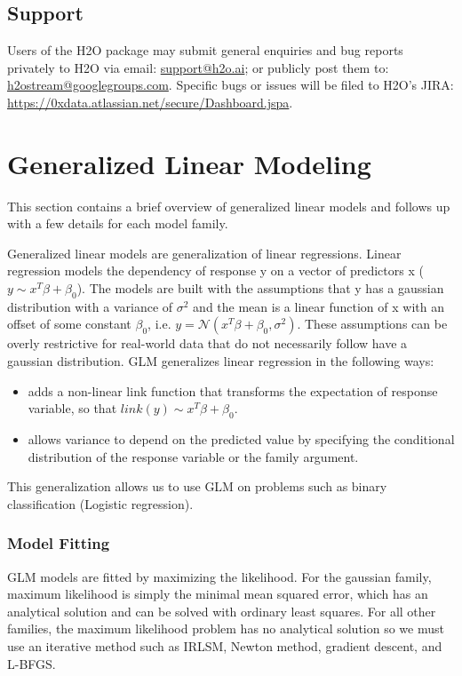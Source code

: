 \documentclass[11pt]{article}
\begin{document}
\subsection{Support} 

Users of the H2O package may submit general enquiries and bug reports privately to H2O via email: \url {support@h2o.ai}; or publicly post them to: \url {h2ostream@googlegroups.com}. Specific bugs or issues will be filed to H2O's JIRA: 
\url{https://0xdata.atlassian.net/secure/Dashboard.jspa}.

\section{Generalized Linear Modeling} 
This section contains a brief overview of generalized linear models and follows up with a few details for each model family.

Generalized linear models are generalization of linear regressions. Linear regression models the dependency of response y on a vector of predictors x ($y \sim x^T \beta + \beta_0$). The models are built with the assumptions that y has a gaussian distribution with a variance of $\sigma^2$ and the mean is a linear function of x with an offset of some constant $\beta_0$, i.e. $ y = \mathcal{N}(x^T \beta + \beta_0 ,  \sigma^2) $. These assumptions can be overly restrictive for real-world data that do not necessarily follow have a gaussian distribution. GLM generalizes linear regression in the following ways: 
\begin{itemize} 
\item adds a non-linear link function that transforms the expectation of response variable, so that $link(y) \sim x^T \beta + \beta_0$.
\item allows variance to depend on the predicted value by specifying the conditional distribution of the response variable or the family argument.

\end{itemize}
This generalization allows us to use GLM on problems such as binary classification (Logistic regression).

\subsubsection{Model Fitting}
GLM models are fitted by maximizing the likelihood. For the gaussian family, maximum likelihood is simply the minimal mean squared error, which has an analytical solution and can be solved with ordinary least squares. For all other families, the maximum likelihood problem has no analytical solution so we must use an iterative method such as IRLSM, Newton method, gradient descent, and L-BFGS.
\end{document}
